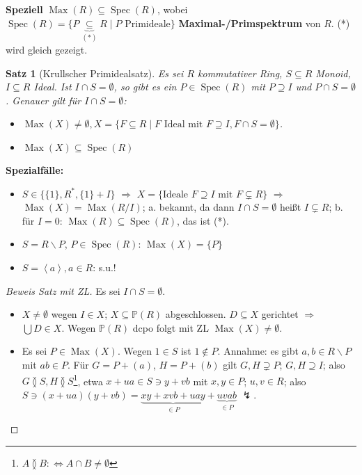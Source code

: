 \documentclass[headsepline=true,DIV=11]{scrartcl}
\newtheorem*{theorem}{Satz}
\theoremstyle{definition}
\newcommand{\Max}{\operatorname{Max}}
\newcommand{\Spec}{\operatorname{Spec}}
\begin{document}
{\bf Speziell} $\Max(R)\subseteq\Spec(R)$, wobei $\Spec(R)=\{P\underbrace{\subseteq}_{(*)} R\mid P\mbox{ Primideale}\}$ {\bf Maximal-/Primspektrum} von
$R$. (*) wird gleich gezeigt.

\begin{theorem}[Krullscher Primidealsatz]
  Es sei $R$ kommutativer Ring, $S\subseteq R$ Monoid, $I\subseteq R$ Ideal. Ist $I\cap S=\emptyset$, so gibt es ein $P\in\Spec(R)$ mit $P\supseteq
  I$ und $P\cap S=\emptyset$. Genauer gilt für $I\cap S=\emptyset$:
  \begin{itemize}
    \item[a.] $\Max(X)\neq\emptyset,X=\{F\subseteq R\mid F\mbox{ Ideal mit } F\supseteq I, F\cap S=\emptyset\}$.
    \item[b.] $\Max(X)\subseteq\Spec(R)$
  \end{itemize}
\end{theorem}

{\bf Spezialfälle:}
\begin{itemize}
  \item[1.] $S\in\{\{1\},R^*,\{1\}+I\}$ $\Rightarrow$ $X=\{\mbox{Ideale } F\supseteq I\mbox{ mit }F\subsetneq R\}$ $\Rightarrow$ $\Max(X)=\Max(R/I)$;
    a. bekannt, da dann $I\cap S=\emptyset$ heißt $I\subsetneq R$; b. für $I=0$: $\Max(R)\subseteq\Spec(R)$, das ist (*).
  \item[2.] $S=R\backslash P$, $P\in\Spec(R)$: $\Max(X)=\{P\}$
  \item[3.] $S=\left<a\right>,a\in R$: s.u.!
\end{itemize}

\begin{proof}[Beweis Satz mit ZL]
  Es sei $I\cap S=\emptyset$.
  \begin{itemize}
    \item[a.] $X\neq\emptyset$ wegen $I\in X$; $X\subseteq\mathbb{P}(R)$ abgeschlossen. $D\subseteq X$ gerichtet $\Rightarrow$ $\bigcup D\in X$. Wegen
      $\mathbb{P}(R)$ dcpo folgt mit ZL $\Max(X)\neq\emptyset$.
    \item[b.] Es sei $P\in\Max(X)$. Wegen $1\in S$ ist $1\not\in P$. Annahme: es gibt $a,b\in R\backslash P$ mit $ab\in P$. Für $G=P+(a)$, $H=P+(b)$
      gilt $G,H\supsetneq P$; $G,H\supseteq I$; also $G\between S, H\between S$\footnote{$A\between B :\Leftrightarrow A\cap B\neq\emptyset$}, etwa
      $x+ua\in S\ni y+vb$ mit $x,y\in P$; $u,v\in R$; also $S\ni(x+ua)(y+vb)=\underbrace{xy+xvb+uay}_{\in P}+\underbrace{uvab}_{\in P}$ $\lightning$.
  \end{itemize}
\end{proof}
\end{document}

